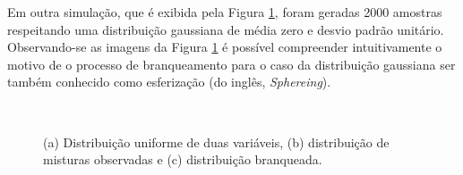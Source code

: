 Em outra simulação, que é exibida pela Figura \ref{fig:bss_whitening_data_gaussian}, foram geradas 2000 amostras respeitando uma distribuição gaussiana de média zero e desvio padrão unitário. Observando-se as imagens da Figura \ref{fig:bss_whitening_data_gaussian} é possível compreender intuitivamente o motivo de o processo de branqueamento para o caso da distribuição gaussiana ser também conhecido como esferização (do inglês, \textit{Sphereing}).


\begin{figure}[H]
    \centering
    \\
    \caption{(a) Distribuição uniforme de duas variáveis, (b) distribuição de misturas observadas e (c) distribuição branqueada.}
    \label{fig:bss_whitening_data_gaussian}
\end{figure}



